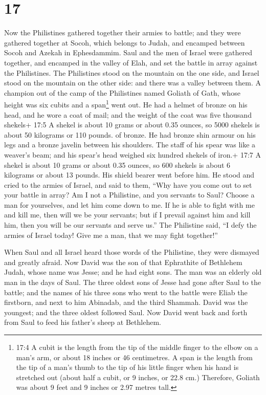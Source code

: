 \hypertarget{section-16}{%
\section{17}\label{section-16}}

 Now the Philistines gathered together their armies to
battle; and they were gathered together at Socoh, which belongs to
Judah, and encamped between Socoh and Azekah in Ephesdammim.
 Saul and the men of Israel were gathered together, and
encamped in the valley of Elah, and set the battle in array against the
Philistines.  The Philistines stood on the mountain on the
one side, and Israel stood on the mountain on the other side: and there
was a valley between them.  A champion out of the camp of
the Philistines named Goliath of Gath, whose height was six cubits and a
span\footnote{17:4 A cubit is the length from the tip of the middle
  finger to the elbow on a man's arm, or about 18 inches or 46
  centimetres. A span is the length from the tip of a man's thumb to the
  tip of his little finger when his hand is stretched out (about half a
  cubit, or 9 inches, or 22.8 cm.) Therefore, Goliath was about 9 feet
  and 9 inches or 2.97 metres tall.} went out.  He had a
helmet of bronze on his head, and he wore a coat of mail; and the weight
of the coat was five thousand shekels+ 17:5 A shekel is about 10 grams
or about 0.35 ounces, so 5000 shekels is about 50 kilograms or 110
pounds. of bronze.  He had bronze shin armour on his legs
and a bronze javelin between his shoulders.  The staff of
his spear was like a weaver's beam; and his spear's head weighed six
hundred shekels of iron.+ 17:7 A shekel is about 10 grams or about 0.35
ounces, so 600 shekels is about 6 kilograms or about 13 pounds. His
shield bearer went before him.  He stood and cried to the
armies of Israel, and said to them, ``Why have you come out to set your
battle in array? Am I not a Philistine, and you servants to Saul? Choose
a man for yourselves, and let him come down to me.  If he is
able to fight with me and kill me, then will we be your servants; but if
I prevail against him and kill him, then you will be our servants and
serve us.''  The Philistine said, ``I defy the armies of
Israel today! Give me a man, that we may fight together!''

 When Saul and all Israel heard those words of the
Philistine, they were dismayed and greatly afraid.  Now
David was the son of that Ephrathite of Bethlehem Judah, whose name was
Jesse; and he had eight sons. The man was an elderly old man in the days
of Saul.  The three oldest sons of Jesse had gone after
Saul to the battle; and the names of his three sons who went to the
battle were Eliab the firstborn, and next to him Abinadab, and the third
Shammah.  David was the youngest; and the three oldest
followed Saul.  Now David went back and forth from Saul to
feed his father's sheep at Bethlehem.

